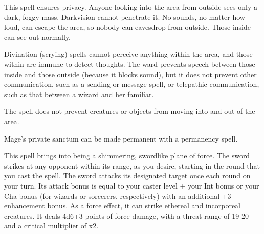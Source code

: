 \begin{multicols}{2}
\begin{small}

\noindent This spell ensures privacy. Anyone looking into the area from outside sees only a dark, foggy mass. Darkvision cannot penetrate it. No sounds, no matter how loud, can escape the area, so nobody can eavesdrop from outside. Those inside can see out normally.

\smallskip\noindent Divination (scrying) spells cannot perceive anything within the area, and those within are immune to detect thoughts. The ward prevents speech between those inside and those outside (because it blocks sound), but it does not prevent other communication, such as a sending or message spell, or telepathic communication, such as that between a wizard and her familiar.

\smallskip\noindent The spell does not prevent creatures or objects from moving into and out of the area.

\smallskip\noindent Mage's private sanctum can be made permanent with a permanency spell.


\noindent This spell brings into being a shimmering, swordlike plane of force. The sword strikes at any opponent within its range, as you desire, starting in the round that you cast the spell. The sword attacks its designated target once each round on your turn. Its attack bonus is equal to your caster level + your Int bonus or your Cha bonus (for wizards or sorcerers, respectively) with an additional +3 enhancement bonus. As a force effect, it can strike ethereal and incorporeal creatures. It deals 4d6+3 points of force damage, with a threat range of 19-20 and a critical multiplier of x2.


\end{small}
\end{multicols}
